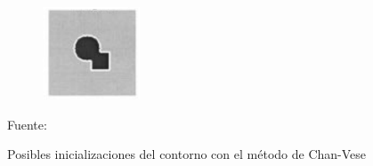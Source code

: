 \begin{figure}[H]
\begin{center}
\begin{subfigure}[t]{2.5in}
			\subcaption{}\label{chanVese3}
		\end{subfigure}
		\begin{subfigure}[t]{2.5in}
			\centering
			\includegraphics[width=.5\textwidth]{./imagenes/chanVese4}	
			\subcaption{}\label{chanVese4}
		\end{subfigure}
	\end{center}
	\caption{Posibles inicializaciones del contorno con el m\'{e}todo de Chan-Vese}
	\vspace{2 mm}	
	\centering	
 	Fuente: \cite{chan}	
	\label{chanVese}
\end{figure} 